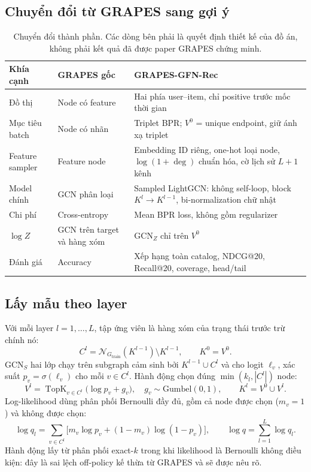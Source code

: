 \documentclass[11pt,a4paper]{article}
\begin{document}
\subsection{Chuyển đổi từ GRAPES sang gợi ý}
\begin{table}[h]
\centering\small
\caption{Chuyển đổi thành phần. Các dòng bên phải là quyết định thiết kế của đồ án, không phải kết quả đã được paper GRAPES chứng minh.}\label{tab:adapt}
\begin{tabularx}{\linewidth}{lYY}
\toprule
Khía cạnh & GRAPES gốc & GRAPES-GFN-Rec \\
\midrule
Đồ thị & Node có feature & Hai phía user--item, chỉ positive trước mốc thời gian \\
Mục tiêu batch & Node có nhãn & Triplet BPR; $V^0$ = unique endpoint, giữ ánh xạ triplet \\
Feature sampler & Feature node & Embedding ID riêng, one-hot loại node, $\log(1+\deg)$ chuẩn hóa, cờ lịch sử $L{+}1$ kênh \\
Model chính & GCN phân loại & Sampled LightGCN: không self-loop, block $K^l \rightarrow K^{l-1}$, bi-normalization chữ nhật \\
Chi phí & Cross-entropy & Mean BPR loss, không gồm regularizer \\
$\log Z$ & GCN trên target và hàng xóm & $\mathrm{GCN}_Z$ chỉ trên $V^0$ \\
Đánh giá & Accuracy & Xếp hạng toàn catalog, NDCG@20, Recall@20, coverage, head/tail \\
\bottomrule
\end{tabularx}
\end{table}

\subsection{Lấy mẫu theo layer}
Với mỗi layer $l = 1,\dots,L$, tập ứng viên là hàng xóm của trạng thái trước trừ chính nó:
\[
C^l = \mathcal{N}_{G_{\text{train}}}(K^{l-1}) \setminus K^{l-1}, \qquad K^0 = V^0.
\]
$\mathrm{GCN}_S$ hai lớp chạy trên subgraph cảm sinh bởi $K^{l-1}\cup C^l$ và cho logit $\ell_v$, xác suất $p_v = \sigma(\ell_v)$ cho mỗi $v\in C^l$. Hành động chọn đúng $\min(k_l,|C^l|)$ node:
\[
V^l = \operatorname{TopK}_{v\in C^l}\big(\log p_v + g_v\big),\quad g_v\sim\mathrm{Gumbel}(0,1), \qquad K^l = V^0 \cup V^l.
\]
Log-likelihood dùng phân phối Bernoulli đầy đủ, gồm cả node được chọn ($m_v=1$) và không được chọn:
\[
\log q_l = \sum_{v\in C^l} \big[m_v \log p_v + (1-m_v)\log(1-p_v)\big], \qquad \log q = \sum_{l=1}^{L} \log q_l.
\]
Hành động lấy từ phân phối exact-$k$ trong khi likelihood là Bernoulli không điều kiện: đây là sai lệch off-policy kế thừa từ GRAPES và sẽ được nêu rõ.
\end{document}
